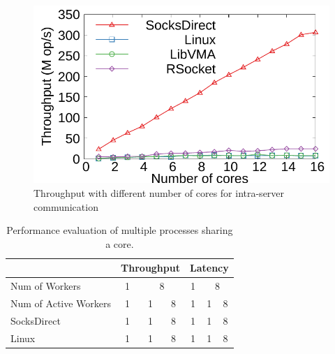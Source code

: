 \begin{figure}[htpb]
	\centering
	\includegraphics[width=\columnwidth]{eval/microbenchmark/corenum-IPC-tput.pdf}
	\caption{Throughput with different number of cores for intra-server communication}
	\label{fig:eval-cornum-ipc}
\end{figure}

\begin{table}[t]
	\centering
		\begin{tabular}{l|c|c|c|c|c|c|}
			\hline
				& \multicolumn{3}{c|}{Throughput} & \multicolumn{3}{c|}{Latency} \\
			\hline
			Num of Workers	& \multicolumn{1}{c|}{1} & \multicolumn{2}{c|}{8} & \multicolumn{1}{c|}{1} & \multicolumn{2}{c|}{8} \\
			\hline
			Num of Active Workers	& 1 & 1 & 8 & 1 & 1 & 8 \\
			\hline
			\hline
			SocksDirect 	& 1 & 1 & 8 & 1 & 1 & 8 \\
			\hline
			Linux 	& 1 & 1 & 8 & 1 & 1 & 8 \\
			\hline
		\end{tabular}
	\caption{Performance evaluation of multiple processes sharing a core.}
	\label{tab:eval-context-switch}
\end{table}




